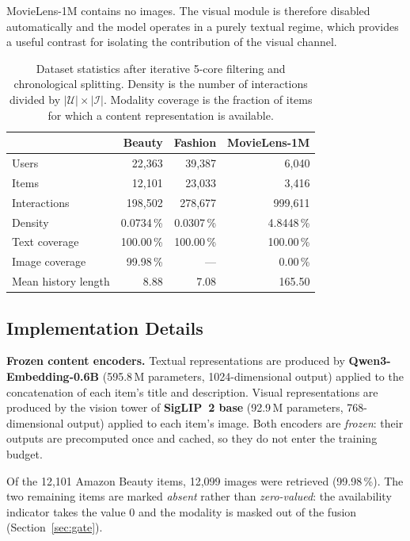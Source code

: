 MovieLens-1M contains no images. The visual module is therefore disabled
automatically and the model operates in a purely textual regime, which provides
a useful contrast for isolating the contribution of the visual channel.

\begin{table}[t]
\centering
\caption{Dataset statistics after iterative 5-core filtering and chronological
splitting. Density is the number of interactions divided by
$|\mathcal{U}|\times|\mathcal{I}|$. Modality coverage is the fraction of items
for which a content representation is available.}
\label{tab:datasets}
\small
\begin{tabular}{lrrr}
\toprule
& \textbf{Beauty} & \textbf{Fashion} & \textbf{MovieLens-1M} \\
\midrule
Users                    & 22{,}363 & 39{,}387 & 6{,}040 \\
Items                    & 12{,}101 & 23{,}033 & 3{,}416 \\
Interactions             & 198{,}502 & 278{,}677 & 999{,}611 \\
Density                  & 0.0734\,\% & 0.0307\,\% & 4.8448\,\% \\
Text coverage            & 100.00\,\% & 100.00\,\% & 100.00\,\% \\
Image coverage           & 99.98\,\%  & ---          & 0.00\,\% \\
Mean history length      & 8.88 & 7.08 & 165.50 \\
\bottomrule
\end{tabular}
\end{table}

\subsection{Implementation Details}
\label{sec:impl}

\textbf{Frozen content encoders.} Textual representations are produced by
\textbf{Qwen3-Embedding-0.6B} (595.8\,M parameters, 1024-dimensional output)
applied to the concatenation of each item's title and description. Visual
representations are produced by the vision tower of \textbf{SigLIP~2 base}
(92.9\,M parameters, 768-dimensional output) applied to each item's image. Both
encoders are \emph{frozen}: their outputs are precomputed once and cached, so
they do not enter the training budget.

Of the 12{,}101 Amazon Beauty items, 12{,}099 images were retrieved
(99.98\,\%). The two remaining items are marked \emph{absent} rather than
\emph{zero-valued}: the availability indicator takes the value 0 and the
modality is masked out of the fusion (Section~\ref{sec:gate}).

